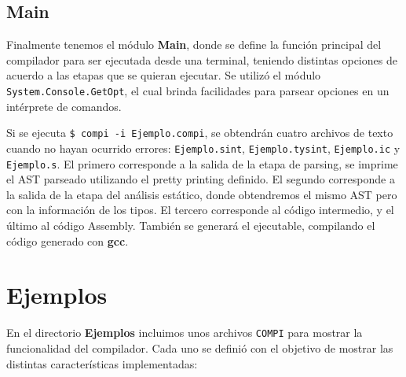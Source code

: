 \documentclass[a4paper,10pt]{article}
\begin{document}
\subsection{Main}

Finalmente tenemos el módulo \textbf{Main}, donde se define la función principal del compilador para ser ejecutada desde una terminal, teniendo
distintas opciones de acuerdo a las etapas que se quieran ejecutar. Se utilizó el módulo \verb|System.Console.GetOpt|, el cual brinda facilidades
para parsear opciones en un intérprete de comandos.

Si se ejecuta \verb|$ compi -i Ejemplo.compi|, se obtendrán cuatro archivos de texto cuando no hayan ocurrido errores: \verb|Ejemplo.sint|, \verb|Ejemplo.tysint|, 
\verb|Ejemplo.ic| y \verb|Ejemplo.s|. El primero corresponde a la salida de la etapa de parsing, se imprime el AST parseado utilizando el pretty printing definido.
 El segundo corresponde a la salida de la etapa del análisis estático, donde obtendremos el mismo AST pero con la información de los tipos.
 El tercero corresponde al código intermedio, y el último al código Assembly. También se generará el ejecutable, compilando el código generado
 con \textbf{gcc}.

\section{Ejemplos}

En el directorio \textbf{Ejemplos} incluimos unos archivos \verb|COMPI| para mostrar la funcionalidad del compilador. Cada uno se definió con el objetivo
de mostrar las distintas características implementadas:
\end{document}
